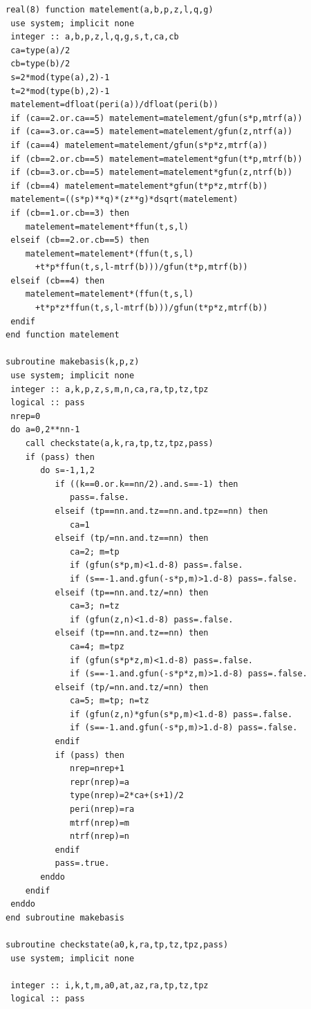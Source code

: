 \documentclass[11pt]{article}
\begin{document}
\begin{lstlisting}
real(8) function matelement(a,b,p,z,l,q,g)
 use system; implicit none
 integer :: a,b,p,z,l,q,g,s,t,ca,cb
 ca=type(a)/2
 cb=type(b)/2
 s=2*mod(type(a),2)-1
 t=2*mod(type(b),2)-1
 matelement=dfloat(peri(a))/dfloat(peri(b))
 if (ca==2.or.ca==5) matelement=matelement/gfun(s*p,mtrf(a))
 if (ca==3.or.ca==5) matelement=matelement/gfun(z,ntrf(a))
 if (ca==4) matelement=matelement/gfun(s*p*z,mtrf(a))
 if (cb==2.or.cb==5) matelement=matelement*gfun(t*p,mtrf(b))
 if (cb==3.or.cb==5) matelement=matelement*gfun(z,ntrf(b))
 if (cb==4) matelement=matelement*gfun(t*p*z,mtrf(b))
 matelement=((s*p)**q)*(z**g)*dsqrt(matelement)
 if (cb==1.or.cb==3) then        
    matelement=matelement*ffun(t,s,l)
 elseif (cb==2.or.cb==5) then
    matelement=matelement*(ffun(t,s,l)
      +t*p*ffun(t,s,l-mtrf(b)))/gfun(t*p,mtrf(b))
 elseif (cb==4) then        
    matelement=matelement*(ffun(t,s,l)
      +t*p*z*ffun(t,s,l-mtrf(b)))/gfun(t*p*z,mtrf(b))
 endif
end function matelement

subroutine makebasis(k,p,z)
 use system; implicit none
 integer :: a,k,p,z,s,m,n,ca,ra,tp,tz,tpz
 logical :: pass
 nrep=0
 do a=0,2**nn-1
    call checkstate(a,k,ra,tp,tz,tpz,pass)
    if (pass) then 
       do s=-1,1,2
          if ((k==0.or.k==nn/2).and.s==-1) then
             pass=.false.
          elseif (tp==nn.and.tz==nn.and.tpz==nn) then
             ca=1
          elseif (tp/=nn.and.tz==nn) then
             ca=2; m=tp
             if (gfun(s*p,m)<1.d-8) pass=.false.
             if (s==-1.and.gfun(-s*p,m)>1.d-8) pass=.false.
          elseif (tp==nn.and.tz/=nn) then
             ca=3; n=tz
             if (gfun(z,n)<1.d-8) pass=.false.
          elseif (tp==nn.and.tz==nn) then      
             ca=4; m=tpz
             if (gfun(s*p*z,m)<1.d-8) pass=.false.
             if (s==-1.and.gfun(-s*p*z,m)>1.d-8) pass=.false.
          elseif (tp/=nn.and.tz/=nn) then
             ca=5; m=tp; n=tz
             if (gfun(z,n)*gfun(s*p,m)<1.d-8) pass=.false.
             if (s==-1.and.gfun(-s*p,m)>1.d-8) pass=.false.             
          endif
          if (pass) then
             nrep=nrep+1
             repr(nrep)=a
             type(nrep)=2*ca+(s+1)/2
             peri(nrep)=ra
             mtrf(nrep)=m
             ntrf(nrep)=n
          endif
          pass=.true.
       enddo
    endif
 enddo
end subroutine makebasis
   
subroutine checkstate(a0,k,ra,tp,tz,tpz,pass)
 use system; implicit none

 integer :: i,k,t,m,a0,at,az,ra,tp,tz,tpz
 logical :: pass


\end{lstlisting}
\end{document}
